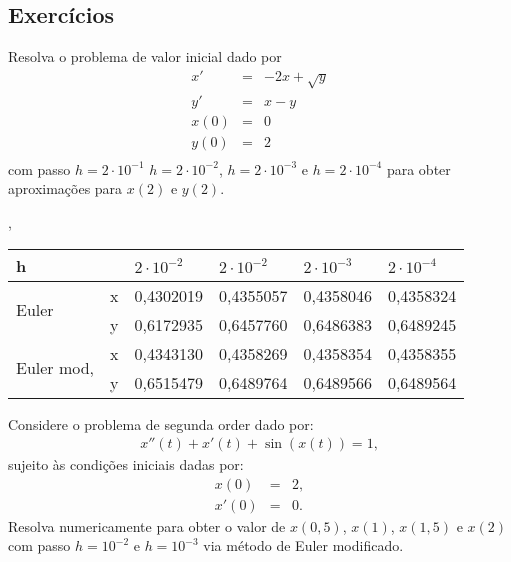 \subsection*{Exercícios}

\begin{exer}Resolva o problema de valor inicial dado por
\begin{eqnarray*}
x'&=& -2x + \sqrt{y}\\
y'&=& x - y\\
x(0)&=&0\\
y(0)&=&2\\
\end{eqnarray*}
com passo $h=2\cdot 10^{-1}$ $h=2\cdot 10^{-2}$, $h=2\cdot 10^{-3}$ e $h=2\cdot 10^{-4}$ para obter aproximações para $x(2)$ e $y(2)$.  
\end{exer},
\begin{resp}
 
 \begin{center}
 \begin{tabular}{|l|l|l|l|l|l|}%
\hline
   h                   & &$2\cdot 10^{-2}$&$2\cdot 10^{-2}$&$2\cdot 10^{-3}$&$2\cdot 10^{-4}$\\
   \hline
 \multirow{2}{*}{Euler}&x&0,4302019&0,4355057&0,4358046&0,4358324\\
                       &y& 0,6172935&0,6457760&0,6486383&0,6489245\\
  \hline
 
 \multirow{2}{*}{Euler mod,}&x&  0,4343130&0,4358269&0,4358354&0,4358355\\
                       &y& 0,6515479&0,6489764&0,6489566&0,6489564 \\

   \hline
   
 
 \end{tabular}
\end{center}
\end{resp}

\begin{exer} Considere o problema de segunda order dado por:
\begin{eqnarray*}
 x''(t)+x'(t)+\sin(x(t))=1,
\end{eqnarray*}
sujeito às condições iniciais dadas por:
\begin{eqnarray*}
x(0)&=&2,\\
x'(0)&=&0.
\end{eqnarray*}
Resolva numericamente para obter o valor de $x(0,5)$, $x(1)$, $x(1,5)$ e $x(2)$ com passo $h=10^{-2}$ e $h=10^{-3}$ via método de Euler modificado.
\end{exer}

